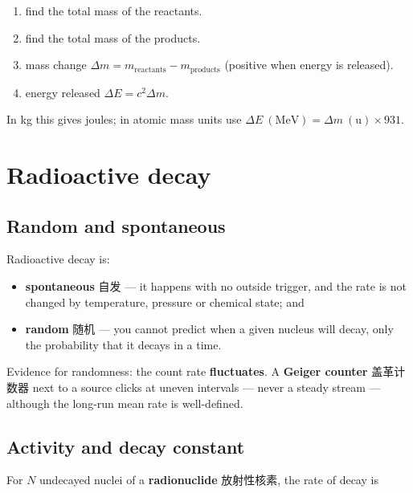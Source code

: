 \documentclass[11pt]{article}
\begin{document}
\begin{enumerate}
\item find the total mass of the reactants.

\item find the total mass of the products.

\item mass change $\Delta m = m_{\text{reactants}} - m_{\text{products}}$ (positive when energy is released).

\item energy released $\Delta E = c^{2} \Delta m$.

\end{enumerate}

In kg this gives joules; in atomic mass units use $\Delta E\ (\text{MeV}) = \Delta m\ (\text{u}) \times 931$.

\section*{Radioactive decay}

\subsection*{Random and spontaneous}

Radioactive decay is:

\begin{itemize}
\item \textbf{spontaneous} 自发 — it happens with no outside trigger, and the rate is not changed by temperature, pressure or chemical state; and

\item \textbf{random} 随机 — you cannot predict when a given nucleus will decay, only the probability that it decays in a time.

\end{itemize}

Evidence for randomness: the count rate \textbf{fluctuates}. A \textbf{Geiger counter} 盖革计数器 next to a source clicks at uneven intervals — never a steady stream — although the long-run mean rate is well-defined.

\subsection*{Activity and decay constant}

For $N$ undecayed nuclei of a \textbf{radionuclide} 放射性核素, the rate of decay is
\end{document}
